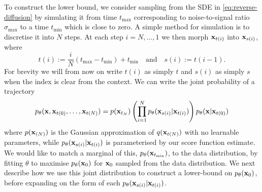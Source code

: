 To construct the lower bound, we consider sampling from the SDE in \cref{eq:reverse-diffusion} by simulating it from time $t_\text{max}$ corresponding to noise-to-signal ratio $\sigma_\text{max}$ to a time $t_\text{min}$ which is close to zero.
A simple method for simulation is to discretise it into $N$ steps. At each step $i = N,\ldots,1$ we then morph ${\mathbf{x}}_{t(i)}$ into ${\mathbf{x}}_{s(i)}$, where
\begin{equation}\nonumber
t(i) := \frac{i}{N} (t_\text{max} - t_\text{min}) + t_\text{min} \quad \text{and} \quad s(i) := t(i-1).
\end{equation}
For brevity we will from now on write $t(i)$ as simply $t$ and $s(i)$ as simply $s$ when the index is clear from the context. We can write the joint probability of a trajectory
\begin{align} \label{eq:diffusion-reverse-joint-prob}
    p_\theta({\mathbf{x}},{\mathbf{x}}_{t(0)},\ldots,{\mathbf{x}}_{t(N)}) = p({\mathbf{x}}_{t_N}) \left( \prod_{i=1}^N p_\theta({\mathbf{x}}_{s(i)} | {\mathbf{x}}_{t(i)}) \right) p_\theta({\mathbf{x}}|{\mathbf{x}}_{t(0)})
\end{align}
where $p({\mathbf{x}}_{(N)})$ is the Gaussian approximation of $q({\mathbf{x}}_{t(N)})$ with no learnable parameters, while $p_\theta({\mathbf{x}}_{s(i)} | {\mathbf{x}}_{t(i)})$ is parameterised by our score function estimate. We would like to match a marginal of this, $p_\theta({\mathbf{x}}_{t_\text{min}})$, to the data distribution, by fitting $\theta$ to maximise $p_\theta({\mathbf{x}}_0)$ for ${\mathbf{x}}_0$ sampled from the data distribution. We next describe how we use this joint distribution to construct a lower-bound on $p_\theta({\mathbf{x}}_0)$, before expanding on the form of each $p_\theta({\mathbf{x}}_{s(i)}|{\mathbf{x}}_{t(i)})$.

